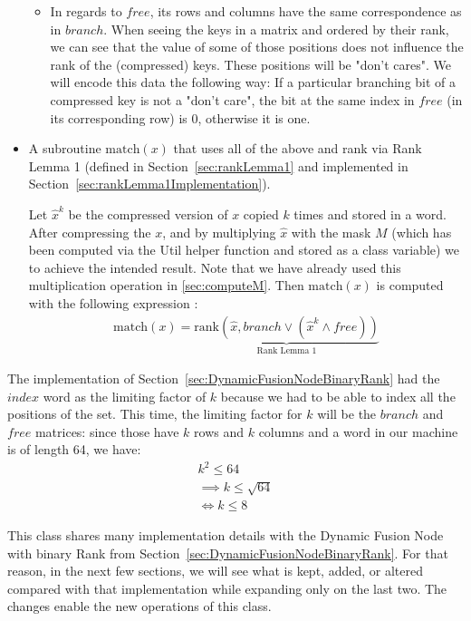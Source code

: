 \begin{itemize}
\begin{itemize}
        \item
        In regards to $free$, its rows and columns have the same correspondence as in $branch$.
        When seeing the keys in a matrix and ordered by their rank, we can see that the value of some of those positions does not influence the rank of the (compressed) keys.
        These positions will be "don't cares".
        We will encode this data the following way: If a particular branching bit of a compressed key is not a "don't care", the bit at the same index in $free$ (in its corresponding row) is 0, otherwise it is one.
    \end{itemize}

    \item
    A subroutine $\text{match}(x)$ that uses all of the above and rank via Rank Lemma 1 (defined in Section~\ref{sec:rankLemma1} and implemented in Section~\ref{sec:rankLemma1Implementation}).
    
    Let $\hat x^k$ be the compressed version of $x$ copied $k$ times and stored in a word. After compressing the $x$, and by multiplying $\hat x$ with the mask $M$ (which has been computed via the {\ttfamily Util} helper function and stored as a class variable) we to achieve the intended result. Note that we have already used this multiplication operation in \ref{sec:computeM}.
    Then $\text{match}(x)$ is computed with the following expression \cite{patrascu2014dynamic}:
    \begin{align*}
        \text{match}(x) = \underbrace{\text{rank}(\hat x, branch \vee (\hat x^k \wedge free))}_{\text{Rank Lemma 1}}
    \end{align*}
\end{itemize}

The implementation of Section~\ref{sec:DynamicFusionNodeBinaryRank} had the $index$ word as the limiting factor of $k$ because we had to be able to index all the positions of the set. This time, the limiting factor for $k$ will be the $branch$ and $free$ matrices: since those have $k$ rows and $k$ columns and a word in our machine is of length 64, we have:
\begin{align*}
    k^2 \leq 64\\
    \implies k \leq \sqrt{64}\\
    \iff k \leq 8
\end{align*}

This class shares many implementation details with the Dynamic Fusion Node with binary Rank from Section~\ref{sec:DynamicFusionNodeBinaryRank}. For that reason, in the next few sections, we will see what is kept, added, or altered compared with that implementation while expanding only on the last two. The changes enable the new operations of this class.

